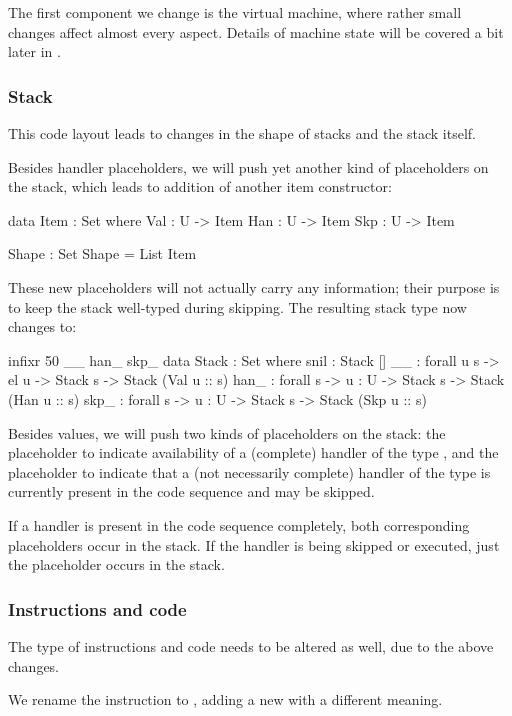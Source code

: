 The first component we change is the virtual machine, where rather small
changes affect almost every aspect. Details of machine state will be covered
a bit later in .

\subsubsection{Stack}

This code layout leads to changes in the shape of stacks and the stack itself.

Besides handler placeholders, we will push yet another kind of placeholders on
the stack, which leads to addition of another item constructor:
\begin{code}
  data Item : Set where
    Val : U -> Item
    Han : U -> Item
    Skp : U -> Item

  Shape : Set
  Shape = List Item
\end{code}
\noindent These new placeholders will not actually carry any information; their
purpose is to keep the stack well-typed during skipping. The resulting stack type
now changes to:
\begin{code}
  infixr 50 _\scons\_ han\scons\_ skp\scons\_
  data Stack : Set where
    snil : Stack []
    _\scons\_ : forall {u s} -> el u -> Stack s -> Stack (Val u :: s)
    han\scons\_ : forall {s} -> {u : U} -> Stack s -> Stack (Han u :: s)
    skp\scons\_ : forall {s} -> {u : U} -> Stack s -> Stack (Skp u :: s)
\end{code}
\noindent Besides values, we will push two kinds of placeholders on the stack:
the placeholder  to indicate availability of a (complete) handler
of the type , and the placeholder  to indicate that a
(not necessarily complete) handler of the type  is currently present
in the code sequence and may be skipped.

If a handler is present in the code sequence completely, both corresponding
placeholders occur in the stack. If the handler is being skipped or executed,
just the  placeholder occurs in the stack.

\subsubsection{Instructions and code}

The type of instructions and code needs to be altered as well, due to the above
changes.

We rename the instruction  to , adding a new
 with a different meaning.

